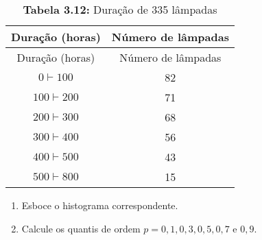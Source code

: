 \documentclass[
]{latex/krantz}
\providecommand{\tightlist}{%
  \setlength{\itemsep}{0pt}\setlength{\parskip}{0pt}}
\theoremstyle{definition}
\theoremstyle{definition}
\theoremstyle{definition}
\theoremstyle{definition}
\theoremstyle{remark}
\begin{document}
\begin{longtable}[]{@{}cc@{}}
\caption{\textbf{Tabela 3.12:} Duração de 335 lâmpadas}\tabularnewline
\toprule\noalign{}
Duração (horas) & Número de lâmpadas \\
\midrule\noalign{}
\endfirsthead
\toprule\noalign{}
Duração (horas) & Número de lâmpadas \\
\midrule\noalign{}
\endhead
\bottomrule\noalign{}
\endlastfoot
\(0 \vdash 100\) & 82 \\
\(100 \vdash 200\) & 71 \\
\(200 \vdash 300\) & 68 \\
\(300 \vdash 400\) & 56 \\
\(400 \vdash 500\) & 43 \\
\(500 \vdash 800\) & 15 \\
\end{longtable}

\begin{enumerate}
\def\labelenumi{\alph{enumi})}
\tightlist
\item
  Esboce o histograma correspondente.
\item
  Calcule os quantis de ordem \(p = 0,1, 0,3, 0,5, 0,7\) e \(0,9\).
\end{enumerate}
\end{document}
